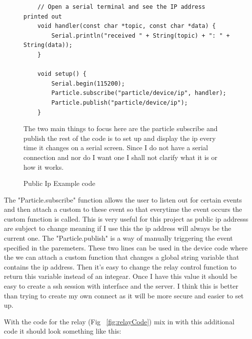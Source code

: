 \documentclass{article}
\begin{document}
\begin{figure}[H]
    \begin{lstlisting}
    // Open a serial terminal and see the IP address printed out
    void handler(const char *topic, const char *data) {
        Serial.println("received " + String(topic) + ": " + String(data));
    }

    void setup() {
        Serial.begin(115200);
        Particle.subscribe("particle/device/ip", handler);
        Particle.publish("particle/device/ip");
    }
    \end{lstlisting}
    \caption{Public Ip Example code} \label{fig:publicIpExample}
    The two main things to focus here are the particle subscribe and publish the rest of the
    code is to set up and display the ip every time it changes on a serial screen. Since
    I do not have a serial connection and nor do I want one I shall not clarify what it
    is or how it works.
\end{figure}

The "Particle.subscribe" function allows the user to listen out for certain events and then
attach a custom to these event so that everytime the event occurs the custom function is
called. This is very useful for this project as  public ip addresss are subject to change meaning
if I use this the ip address will always be the current one. The "Particle.publish" is a way
of manually triggering the event specified in the paremeters. These two lines can be used
in the device code where the we can attach a custom function that changes a global string variable
that contains the ip address. Then it's easy to change the relay control function to return this
variable instead of an integear. Once I have this value it should be easy to create a ssh session
with interface and the server. I think this is better than trying to create my own connect as it
will be more secure and easier to set up.

With the code for the relay (Fig ~\ref{fig:relayCode}) mix in with this additional code it should look
something like this:
\end{document}

